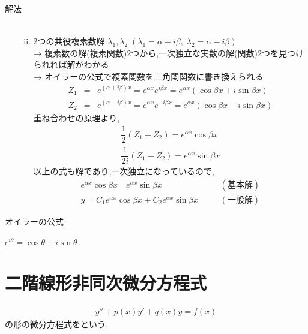 \documentclass[a4paper]{jsarticle}
\begin{document}
\begin{itembox}[l]{解法}
\begin{enumerate}[(1)]
\begin{enumerate}[(i)]
\begin{eqnarray*}
                        \end{eqnarray*}
                  \item 2つの共役複素数解 $\lambda_1,\lambda_2\;\left(\lambda_1=\alpha +i\beta,\;\lambda_2=\alpha-i\beta\right)$\\
                        → 複素数の解(複素関数)2つから,一次独立な実数の解(関数)2つを見つけられれば解がわかる\\
                        → オイラーの公式で複素関数を三角関関数に書き換えられる\\
                        \begin{eqnarray*}
                            Z_1&=&e^{\left(\alpha+i\beta\right)x}=e^{\alpha x}e^{i\beta x}=e^{\alpha x}\left(\cos\beta x+i\sin\beta x\right)\\
                            Z_2&=&e^{\left(\alpha-i\beta\right)x}=e^{\alpha x}e^{-i\beta x}=e^{\alpha x}\left(\cos\beta x-i\sin\beta x\right)
                        \end{eqnarray*}
                        重ね合わせの原理より,
                        \begin{eqnarray*}
                            \dfrac{1}{2}\left(Z_1+Z_2\right)=e^{\alpha x}\cos\beta x\\
                            \dfrac{1}{2i}\left(Z_1-Z_2\right)=e^{\alpha x}\sin\beta x
                        \end{eqnarray*}
                        以上の式も解であり,一次独立になっているので,
                        \begin{eqnarray*}
                            e^{\alpha x}\cos\beta x\quad e^{\alpha x}\sin\beta x\quad &&(基本解)\\
                            y=C_1 e^{\alpha x}\cos\beta x+C_2e^{\alpha x}\sin\beta x\quad &&(一般解)
                        \end{eqnarray*}
              \end{enumerate}
    \end{enumerate}
\end{itembox}
\begin{itembox}[l]{オイラーの公式}
    \begin{center}
        $e^{i\theta}=\cos\theta+i\sin\theta$
    \end{center}
\end{itembox}
\section{二階線形非同次微分方程式}
\begin{eqnarray*}
    y''+p\left(x\right)y'+q\left(x\right)y=f\left(x\right)
\end{eqnarray*}
の形の微分方程式をという.
\end{document}
